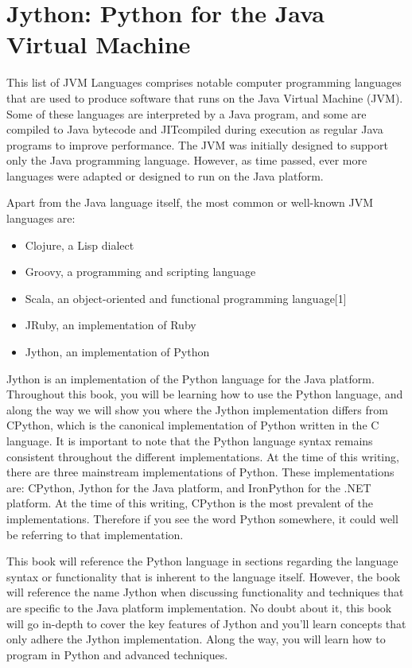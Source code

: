 \newpage
\section{Jython: Python for the Java Virtual Machine}

This list of JVM Languages comprises notable computer
programming languages that are used to produce
software that runs on the Java Virtual Machine (JVM).
Some of these languages are interpreted by a Java program,
and some are compiled to Java bytecode and JITcompiled
during execution as regular Java programs to
improve performance.
The JVM was initially designed to support only the Java
programming language. However, as time passed, ever
more languages were adapted or designed to run on the
Java platform.

Apart from the Java language itself, the most common or
well-known JVM languages are:

\begin{itemize}		
	\item Clojure, a Lisp dialect
	\item Groovy, a programming and scripting language
	\item Scala, an object-oriented and functional programming language[1]
	\item JRuby, an implementation of Ruby
	\item Jython, an implementation of Python
\end{itemize}

Jython is an implementation of the Python language for the Java platform. Throughout this book, you will be learning how to use the Python language, and along the way we will show you where the Jython implementation differs from CPython, which is the canonical implementation of Python written in the C language. It is important to note that the Python language syntax remains consistent throughout the different implementations. At the time of this writing, there are three mainstream implementations of Python. These implementations are: CPython, Jython for the Java platform, and IronPython for the .NET platform. At the time of this writing, CPython is the most prevalent of the implementations. Therefore if you see the word Python somewhere, it could well be referring to that implementation.

This book will reference the Python language in sections regarding the language syntax or functionality that is inherent to the language itself. However, the book will reference the name Jython when discussing functionality and techniques that are specific to the Java platform implementation. No doubt about it, this book will go in-depth to cover the key features of Jython and you’ll learn concepts that only adhere the Jython implementation. Along the way, you will learn how to program in Python and advanced techniques.

